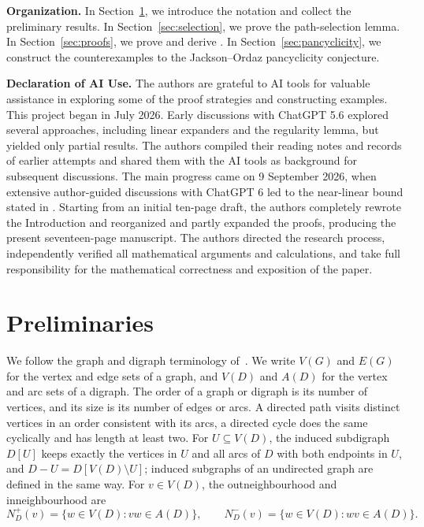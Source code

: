 \documentclass[11pt,a4paper]{article}
\theoremstyle{remark}
\numberwithin{equation}{section}
\begin{document}
\medskip\noindent\textbf{Organization.}
In Section~\ref{sec:preliminaries}, we introduce the notation and collect the preliminary results.
In Section~\ref{sec:selection}, we prove the path-selection lemma.
In Section~\ref{sec:proofs}, we prove  and derive .
In Section~\ref{sec:pancyclicity}, we construct the counterexamples to the Jackson--Ordaz pancyclicity conjecture.

\medskip\noindent\textbf{Declaration of AI Use.}
The authors are grateful to AI tools for valuable assistance in exploring some of the proof strategies and constructing examples. This project began in July 2026. Early discussions with ChatGPT 5.6 explored several approaches, including linear expanders and the regularity lemma, but yielded only partial results. The authors compiled their reading notes and records of earlier attempts and shared them with the AI tools as background for subsequent discussions. The main progress came on 9 September 2026, when extensive author-guided discussions with ChatGPT 6 led to the near-linear bound stated in .
Starting from an initial ten-page draft, the authors completely rewrote the Introduction and reorganized and partly expanded the proofs, producing the present seventeen-page manuscript. The authors directed the research process, independently verified all mathematical arguments and calculations, and take full responsibility for the mathematical correctness and exposition of the paper.

	\section{Preliminaries}\label{sec:preliminaries}
	We follow the graph and digraph terminology of~\cite{BG,BM}.
	We write $V(G)$ and $E(G)$ for the vertex and edge sets of a graph, and $V(D)$ and $A(D)$ for the vertex and arc sets of a digraph.
	The order of a graph or digraph is its number of vertices, and its size is its number of edges or arcs.
	A directed path visits distinct vertices in an order consistent with its arcs, a directed cycle does the same cyclically and has length at least two.
	For $U\subseteq V(D)$, the induced subdigraph $D[U]$ keeps exactly the vertices in $U$ and all arcs
	of $D$ with both endpoints in $U$, and $D-U=D[V(D)\setminus U]$; induced subgraphs of an undirected graph
	are defined in the same way.
	For $v\in V(D)$, the outneighbourhood and inneighbourhood are
	\[
	N_D^+(v)=\{w\in V(D):vw\in A(D)\},\qquad
	N_D^-(v)=\{w\in V(D):wv\in A(D)\}.
	\]
	
\end{document}
